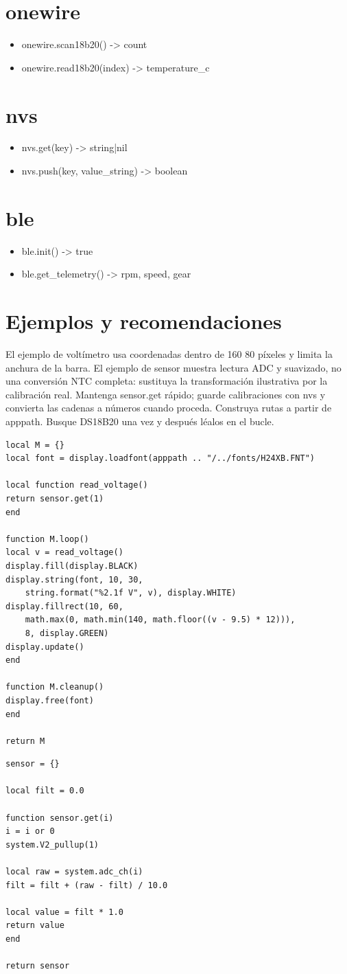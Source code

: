 \section{onewire}
\begin{itemize}
\item onewire.scan18b20() -> count
\item onewire.read18b20(index) -> temperature\_c
\end{itemize}
\section{nvs}
\begin{itemize}
\item nvs.get(key) -> string|nil
\item nvs.push(key, value\_string) -> boolean
\end{itemize}
\section{ble}
\begin{itemize}
\item ble.init() -> true
\item ble.get\_telemetry() -> rpm, speed, gear
\end{itemize}
\section{Ejemplos y recomendaciones}
El ejemplo de voltímetro usa coordenadas dentro de 160\,\texttimes\,80 píxeles y limita la anchura de la barra. El ejemplo de sensor muestra lectura ADC y suavizado, no una conversión NTC completa: sustituya la transformación ilustrativa por la calibración real. Mantenga sensor.get rápido; guarde calibraciones con nvs y convierta las cadenas a números cuando proceda. Construya rutas a partir de apppath. Busque DS18B20 una vez y después léalos en el bucle.
\begin{verbatim}
local M = {}
local font = display.loadfont(apppath .. "/../fonts/H24XB.FNT")

local function read_voltage()
return sensor.get(1)
end

function M.loop()
local v = read_voltage()
display.fill(display.BLACK)
display.string(font, 10, 30,
    string.format("%2.1f V", v), display.WHITE)
display.fillrect(10, 60,
    math.max(0, math.min(140, math.floor((v - 9.5) * 12))),
    8, display.GREEN)
display.update()
end

function M.cleanup()
display.free(font)
end

return M
\end{verbatim}
\begin{verbatim}
sensor = {}

local filt = 0.0

function sensor.get(i)
i = i or 0
system.V2_pullup(1)

local raw = system.adc_ch(i)
filt = filt + (raw - filt) / 10.0

local value = filt * 1.0
return value
end

return sensor
\end{verbatim}
